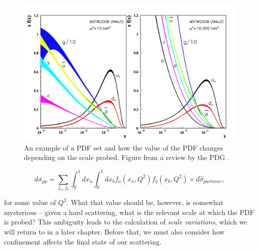 \begin{figure}[t]
\centering
\includegraphics[scale=0.7]{Images/PDF.png} 
\caption{An example of a PDF set and how the value of the PDF changes depending on the scale probed. Figure from a review by the PDG \cite{PDG}.}
\label{fig:PDF}
\end{figure}

\begin{equation}
d \sigma_{pp} = \sum_{f_a, f_b} \int_0^1 dx_a \int_0^1 dx_b f_a(x_a, Q^2) f_b(x_b, Q^2) \times d\hat{\sigma}_{partonic},
\end{equation}

for some value of $Q^2$. What that value should be, however, is somewhat mysterious -- given a hard scattering, what is the relevant scale at which the PDF is probed? This ambiguity leads to the calculation of \emph{scale variations}, which we will return to in a later chapter. Before that, we must also consider how confinement affects the final state of our scattering. 

